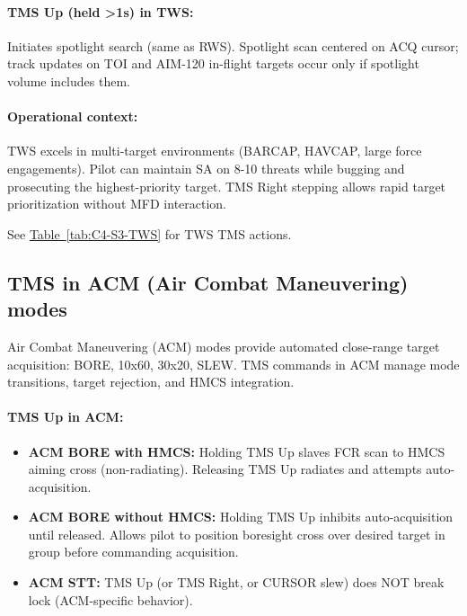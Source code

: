 \documentclass[11pt, a4paper, twoside]{report}
\newcommand{\tabref}[1]{\hyperref[#1]{Table~\ref*{#1}}}
\begin{document}
\paragraph{TMS Up (held >1s) in TWS:}
Initiates spotlight search (same as RWS). Spotlight scan centered on ACQ cursor; track updates on TOI and AIM-120 in-flight targets occur only if spotlight volume includes them.

\paragraph{Operational context:}
TWS excels in multi-target environments (BARCAP, HAVCAP, large force engagements). Pilot can maintain SA on 8-10 threats while bugging and prosecuting the highest-priority target. TMS Right stepping allows rapid target prioritization without MFD interaction.

See \tabref{tab:C4-S3-TWS} for TWS TMS actions.

\subsection{TMS in ACM (Air Combat Maneuvering) modes}
\label{sec:C4-S3-S4}

Air Combat Maneuvering (ACM) modes provide automated close-range target acquisition: BORE, 10x60, 30x20, SLEW. TMS commands in ACM manage mode transitions, target rejection, and HMCS integration.

\paragraph{TMS Up in ACM:}
\begin{itemize}
    \item \textbf{ACM BORE with HMCS:} Holding TMS Up slaves FCR scan to HMCS aiming cross (non-radiating). Releasing TMS Up radiates and attempts auto-acquisition.
    \item \textbf{ACM BORE without HMCS:} Holding TMS Up inhibits auto-acquisition until released. Allows pilot to position boresight cross over desired target in group before commanding acquisition.
    \item \textbf{ACM STT:} TMS Up (or TMS Right, or CURSOR slew) does NOT break lock (ACM-specific behavior).
\end{itemize}
\end{document}
